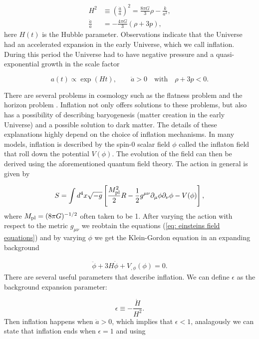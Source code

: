 \begin{align}
    H^2 &\equiv \left( \frac{\dot{a}}{a} \right)^2 = \frac{8 \pi G}{3} \rho - \frac{k}{a^2}, \label{eq: Friedmann equation} \\
    \frac{\ddot{a}}{a} &= -\frac{4 \pi G}{3} (\rho + 3 p) \label{eq: acceleration equation},
\end{align}
here $H(t)$ is the Hubble parameter. Observations indicate that the Universe had an accelerated expansion in the early Universe, which we call inflation. During this period the Universe had to have negative pressure and a quasi-exponential growth in the scale factor

\begin{equation}
    a(t) \propto \exp(Ht), \qquad \ddot{a}>0 \quad \text {with} \quad \rho + 3p<0.
\end{equation}

There are several problems in cosmology such as the flatness problem and the horizon problem \cite{dimopoulos2020introduction}. Inflation not only offers solutions to these problems, but also has a possibility of describing baryogenesis (matter creation in the early Universe) and a possible solution to dark matter. The details of these explanations highly depend on the choice of inflation mechanisms. In many models, inflation is described by the spin-0 scalar field $\phi$ called the inflaton field that roll down the potential $V(\phi)$. The evolution of the field can then be derived using the aforementioned quantum field theory. The action in general is given by

\begin{equation}
    S = \int d^4 x \sqrt{-g} \left[ \frac{M_{\rm pl}^2}{2}R - \frac{1}{2} g^{\mu \nu} \partial_{\mu} \phi \partial_{\nu} \phi - V(\phi) \right],
\end{equation}
where $M_{\rm pl} = (8 \pi G)^{-1/2}$ often taken to be 1. After varying the action with respect to the metric $g_{\mu \nu}$ we reobtain the equations (\ref{eq: einsteins field equations}) and by varying $\phi$ we get the Klein-Gordon equation in an expanding background \cite{kofman1997towards}

\begin{eqnarray}
    \ddot{\phi} + 3H \dot{\phi} + V_{, \phi}(\phi) = 0.
\end{eqnarray}
There are several useful parameters that describe inflation. We can define $\epsilon$ as the background expansion parameter:

\begin{equation}
    \epsilon \equiv - \frac{\dot{H}}{H^2}.
\end{equation}
Then inflation happens when $\ddot{a} > 0 $, which implies that $\epsilon < 1$, analagously we can state that inflation ends when $\epsilon = 1$ and using

